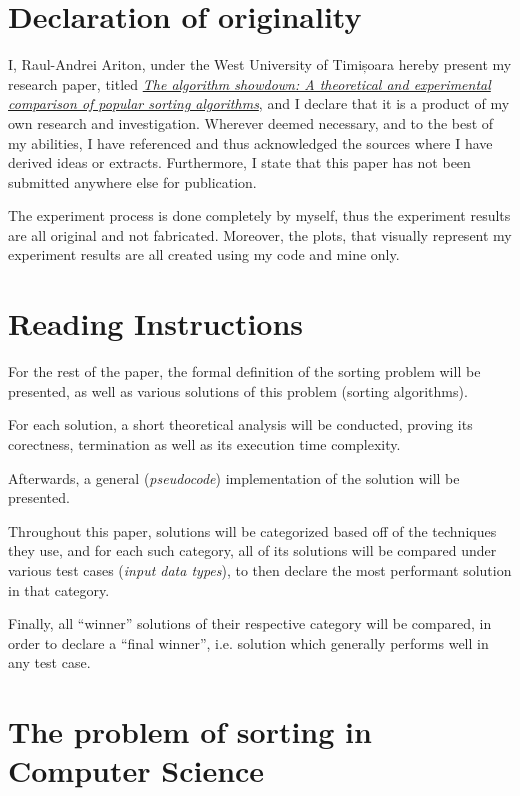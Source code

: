 \documentclass[a4paper]{article}
\begin{document}
    \newpage
    \section*{Declaration of originality}
        I, Raul-Andrei Ariton, under the West University of Timișoara hereby present my research paper, titled \hyperlink{title}{\emph{The algorithm showdown: A theoretical and experimental comparison of popular sorting algorithms}}, and I declare that it is a product of my own research and investigation. Wherever deemed necessary, and to the best of my abilities, I have referenced and thus acknowledged the sources where I have derived ideas or extracts. Furthermore, I state that this paper has not been submitted anywhere else for publication.
        \vspace*{1em}

        The experiment process is done completely by myself, thus the experiment results are all original and not fabricated. Moreover, the plots, that visually represent my experiment results are all created using my code and mine only.

    \newpage
    \section{Reading Instructions}
    
        For the rest of the paper, the formal definition of the sorting problem will be presented, as well as various solutions of this problem (sorting algorithms). 
        
        For each solution, a short theoretical analysis will be conducted, proving its corectness, termination as well as its execution time complexity.

        Afterwards, a general (\emph{pseudocode}) implementation of the solution will be presented.

        Throughout this paper, solutions will be categorized based off of the techniques they use, and for each such category, all of its solutions will be compared under various test cases (\emph{input data types}), to then declare the most performant solution in that category. 
        
        Finally, all ``winner'' solutions of their respective category will be compared, in order to declare a ``final winner'', i.e. solution which generally performs well in any test case.
    
    \newpage
    \section{The problem of sorting in Computer Science}
\end{document}
